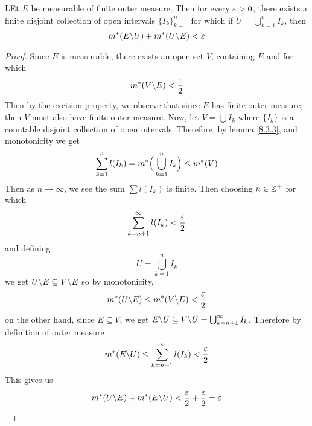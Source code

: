 \begin{theorem}\label{8.4.3}
    LEt $E$ be measurable of finite outer measure. Then for every  $\varepsilon>0$, there
    exists a finite disjoint collection of open intervals  $\{I_k\}_{k=1}^n$ for
    which if $U=\bigcup_{k=1}^n{I_k}$, then
    \begin{equation*}
        m^\ast(E \backslash U)+m^\ast(U \backslash E)<\varepsilon
    \end{equation*}
\end{theorem}
\begin{proof}
    Since $E$ is measurable, there exists an open set  $V$, containing  $E$ and
    for which
    \begin{equation*}
        m^\ast(V \backslash E)<\frac{\varepsilon}{2}
    \end{equation*}
    Then by the excision property, we observe that since $E$ has finite outer
    measure, then $V$ must also have finite outer measure. Now, let
    $V=\bigcup{I_k}$ where $\{I_k\}$ is a countable disjoint collection of open
    intervals. Therefore, by lemma \ref{8.3.3}, and monotonicity we get
    \begin{equation*}
        \sum_{k=1}^n{l(I_k)}=m^\ast\Big{(} \bigcup_{k=1}^n{I_k} \Big{)} \leq
        m^\ast(V)
    \end{equation*}
    Then as $n \xrightarrow{} \infty$, we see the sum $\sum{l(I_k)}$ is finite.
    Then choosing $n \in \mathbb{Z}^+$ for which
    \begin{equation*}
        \sum_{k=n+1}^{\infty}{l(I_k)}<\frac{\varepsilon}{2}
    \end{equation*}
    and defining
    \begin{equation*}
        U=\bigcup_{k=1}^n{I_k}
    \end{equation*}
    we get $U \backslash E \subseteq V \backslash E$ so by monotonicity,
    \begin{equation*}
        m^\ast(U \backslash E) \leq m^\ast(V \backslash E)<\frac{\varepsilon}{2}
    \end{equation*}
    on the other hand, since $E \subseteq V$, we get  $E \backslash U \subseteq
    V \backslash U=\bigcup_{k=n+1}^\infty{I_k}$. Therefore by definition of outer
    measure
    \begin{equation*}
        m^\ast(E \backslash U) \leq \sum_{k=n+1}^\infty{l(I_k)}<\frac{\varepsilon}{2}
    \end{equation*}
    This gives us
    \begin{equation*}
        m^\ast(U \backslash E)+m^\ast(E \backslash U)<\frac{\varepsilon}{2}+\frac{\varepsilon}{2}=\varepsilon
    \end{equation*}
\end{proof}
